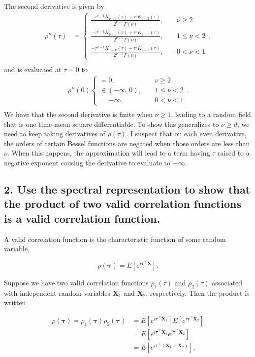 \documentclass[12pt]{article}
\newcommand{\m}[1]{\mathbf{\bm{#1}}}
\begin{document}
The second derivative is given by
\begin{align*}
\rho''(\tau) &= \begin{cases} \frac{-\tau^{\nu-1} K_{\nu-1}(\tau)+\tau^\nu K_{\nu-2}(\tau)}{2^{\nu-1}\Gamma(\nu)},~~~~~ &\nu\geq2 \\
  \frac{-\tau^{\nu-1} K_{\nu-1}(\tau)+\tau^\nu K_{2-\nu}(\tau)}{2^{\nu-1}\Gamma(\nu)},~~~~~ &1\leq\nu<2 \\
  \frac{-\tau^{\nu-1} K_{1-\nu}(\tau)+\tau^\nu K_{2-\nu}(\tau)}{2^{\nu-1}\Gamma(\nu)},~~~~~ &0<\nu<1 
\end{cases}, \\
\end{align*}
and is evaluated at $\tau=0$ to
\begin{align*}
\rho''(0) \begin{cases} =0,~~~~~ &\nu\geq2 \\
  \in(-\infty,0),~~~~~ &1\leq\nu<2 \\
  =-\infty,~~~~~ &0<\nu<1 
\end{cases}. \\
\end{align*}
We have that the second derivative is finite when $\nu\geq 1$, leading to a random field that is one time mean square differentiable. To show this generalizes to $\nu\geq d$, we need to keep taking derivatives of $\rho(\tau)$. I suspect that on each even derivative, the orders of certain Bessel functions are negated when those orders are less than $\nu$. When this happens, the approximation will lead to a term having $\tau$ raised to a negative exponent causing the derivative to evaluate to $-\infty$.


\subsection*{2. Use the spectral representation to show that the product of two valid correlation functions is a valid correlation function.}

A valid correlation function is the characteristic function of some random variable,

\[ \rho(\m{\tau}) = E\left[e^{i\m{\tau}^\top\m{X}}\right]. \]

Suppose we have two valid correlation functions $\rho_1(\tau)$ and $\rho_2(\tau)$ associated with independent random variables $\m{X}_1$ and $\m{X}_2$, respectively. Then the product is written

\begin{align*}
\rho(\m{\tau}) = \rho_1(\m{\tau})\rho_2(\m{\tau}) &= E\left[e^{i\m{\tau}^\top\m{X}_1}\right]E\left[e^{i\m{\tau}^\top\m{X}_2}\right] \\
 &= E\left[e^{i\m{\tau}^\top\m{X}_1}e^{i\m{\tau}^\top\m{X}_2}\right] \\
 &= E\left[e^{i\m{\tau}^\top(\m{X}_1+\m{X}_2)}\right], 
\end{align*}
\end{document}
